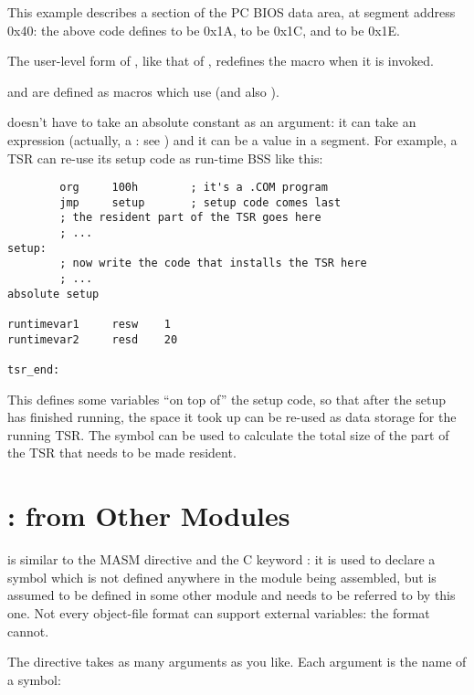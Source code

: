 This example describes a section of the PC BIOS data area, at
segment address 0x40: the above code defines  to be
0x1A,  to be 0x1C, and  to be 0x1E.

The user-level form of , like that of ,
redefines the  macro when it is invoked.

 and  are defined as macros
which use  (and also ).

 doesn't have to take an absolute constant as an
argument: it can take an expression (actually, a : see ) and it can be a value in a segment.
For example, a TSR can re-use its setup code as run-time BSS like this:

\begin{lstlisting}
        org     100h        ; it's a .COM program
        jmp     setup       ; setup code comes last
        ; the resident part of the TSR goes here
        ; ...
setup:
        ; now write the code that installs the TSR here
        ; ...
absolute setup

runtimevar1     resw    1
runtimevar2     resd    20

tsr_end:
\end{lstlisting}

This defines some variables ``on top of'' the setup code, so that
after the setup has finished running, the space it took up can be
re-used as data storage for the running TSR. The symbol
 can be used to calculate the total size of
the part of the TSR that needs to be made resident.

\section{:  from Other Modules}
\label{sec:extern}

 is similar to the MASM directive  and
the C keyword : it is used to declare a symbol which
is not defined anywhere in the module being assembled, but is assumed
to be defined in some other module and needs to be referred to by this
one. Not every object-file format can support external variables:
the  format cannot.

The  directive takes as many arguments as you like.
Each argument is the name of a symbol:

